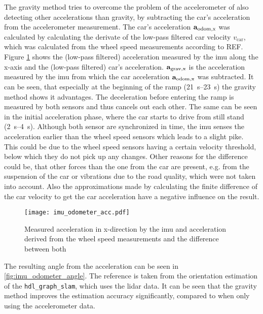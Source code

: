 The gravity method tries to overcome the problem of the accelerometer of also detecting other accelerations than gravity, by subtracting the car's acceleration from the accelerometer measurement.
The car's acceleration $\vb{a}_\mathrm{odom,x} $ was calculated by calculating the derivate of the low-pass filtered car velocity $v_\mathrm{car} $, which was calculated from the wheel speed measurements according to REF.
Figure \ref{fig:imu_odometer_acc} shows the (low-pass filtered) acceleration measured by the \gls{imu} along the x-axis and the (low-pass filtered) car's acceleration.
$\vb{a}_\mathrm{grav,x} $ is the acceleration measured by the \gls{imu} from which the car acceleration $\vb{a}_\mathrm{odom,x} $ was subtracted.
It can be seen, that especially at the beginning of the ramp (\SIrange{21}{23}{\second}) the gravity method shows it advantages.
The deceleration before entering the ramp is measured by both sensors and thus cancels out each other.
The same can be seen in the initial acceleration phase, where the car starts to drive from still stand (\SIrange[]{2}{4}{\second}).
Although both sensor are synchronized in time, the \gls{imu} senses the acceleration earlier than the wheel speed sensors which leads to a slight pike.
This could be due to the wheel speed sensors having a certain velocity threshold, below which they do not pick up any changes.
Other reasons for the difference could be, that other forces than the one from the car are present, e.g. from the suspension of the car or vibrations due to the road quality, which were not taken into account.
Also the approximations made by calculating the finite difference of the car velocity to get the car acceleration have a negative influence on the result.
\begin{figure}[htbp]
	\centering
	\texttt{[image: imu\_odometer\_acc.pdf]}
	\caption[Acceleration from \gls{imu} and odometer]{Measured acceleration in x-direction by the \gls{imu} and acceleration derived from the wheel speed measurements and the difference between both}
	\label{fig:imu_odometer_acc}
\end{figure}
The resulting angle from the acceleration can be seen in \cref{fig:imu_odometer_angle}.
The reference is taken from the orientation estimation of the \texttt{hdl\_graph\_slam}, which uses the \gls{lidar} data.
It can be seen that the gravity method improves the estimation accuracy significantly, compared to when only using the accelerometer data.
